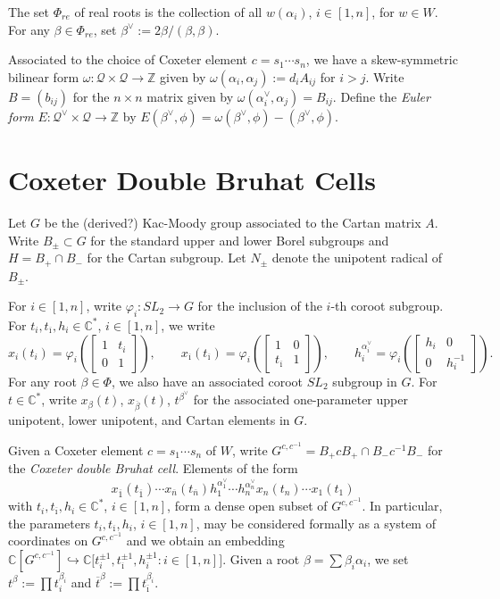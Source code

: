 \documentclass{amsart}
\numberwithin{theorem}{section}
\newcommand{\cQ}{\mathcal{Q}}
\newcommand{\CC}{\mathbb{C}}
\newcommand{\ZZ}{\mathbb{Z}}
\newcommand{\ol}[1]{{\overline{#1}}}
\newcommand{\into}{\hookrightarrow}
\newcommand{\oi}{{\overline{\imath}}}
\newcommand{\ot}{{\overline{t}}}
\begin{document}
    The set $\Phi_{re}$ of real roots is the collection of all $w(\alpha_i)$, $i\in[1,n]$, for $w\in W$.
    For any $\beta\in\Phi_{re}$, set $\beta^\vee:=2\beta/(\beta,\beta)$.

    Associated to the choice of Coxeter element $c=s_1\cdots s_n$, we have a skew-symmetric bilinear form $\omega:\cQ\times\cQ\to\ZZ$ given by $\omega(\alpha_i,\alpha_j):=d_iA_{ij}$ for $i>j$.
    Write $B=(b_{ij})$ for the $n\times n$ matrix given by $\omega(\alpha_i^\vee,\alpha_j)=B_{ij}$.
    Define the \emph{Euler form} $E:\cQ^\vee\times\cQ\to\ZZ$ by $E(\beta^\vee,\phi)=\omega(\beta^\vee,\phi)-(\beta^\vee,\phi)$.


  \section{Coxeter Double Bruhat Cells}
    Let $G$ be the (derived?) Kac-Moody group associated to the Cartan matrix $A$.
    Write $B_\pm\subset G$ for the standard upper and lower Borel subgroups and $H=B_+\cap B_-$ for the Cartan subgroup.
    Let $N_\pm$ denote the unipotent radical of $B_\pm$.

    For $i\in[1,n]$, write $\varphi_i:SL_2\to G$ for the inclusion of the $i$-th coroot subgroup.
    For $t_i,t_\oi,h_i\in\CC^*$, $i\in[1,n]$, we write
    \[x_i(t_i)=\varphi_i\left(\left[\begin{array}{cc} 1 & t_i\\ 0 & 1\end{array}\right]\right),\qquad x_\oi(t_\oi)=\varphi_i\left(\left[\begin{array}{cc} 1 & 0\\ t_\oi & 1\end{array}\right]\right), \qquad h_i^{\alpha_i^\vee}=\varphi_i\left(\left[\begin{array}{cc} h_i & 0\\ 0 & h_i^{-1}\end{array}\right]\right).\]
    For any root $\beta\in\Phi$, we also have an associated coroot $SL_2$ subgroup in $G$.
    For $t\in\CC^*$, write $x_\beta(t)$, $x_{\ol{\beta}}(t)$, $t^{\beta^\vee}$ for the associated one-parameter upper unipotent, lower unipotent, and Cartan elements in $G$.

    Given a Coxeter element $c=s_1\cdots s_n$ of $W$, write $G^{c,c^{-1}}=B_+ c B_+\cap B_- c^{-1} B_-$ for the \emph{Coxeter double Bruhat cell}.
    Elements of the form 
    \begin{equation}
      \label{eq:generic element}
      x_{\ol{1}}(t_{\ol{1}})\cdots x_{\ol{n}}(t_{\ol{n}}) h_1^{\alpha_1^\vee}\cdots h_n^{\alpha_n^\vee} x_n(t_n)\cdots x_1(t_1)
    \end{equation}
    with $t_i,t_\oi,h_i\in\CC^*$, $i\in[1,n]$, form a dense open subset of $G^{c,c^{-1}}$.
    In particular, the parameters $t_i,t_\oi,h_i$, $i\in[1,n]$, may be considered formally as a system of coordinates on $G^{c,c^{-1}}$ and we obtain an embedding $\CC[G^{c,c^{-1}}]\into\CC\big[t_i^{\pm1},t_\oi^{\pm1},h_i^{\pm1}:i\in[1,n]\big]$.
    Given a root $\beta=\sum\beta_i\alpha_i$, we set $t^\beta:=\prod t_i^{\beta_i}$ and $\ot^\beta:=\prod t_\oi^{\beta_i}$.
\end{document}
